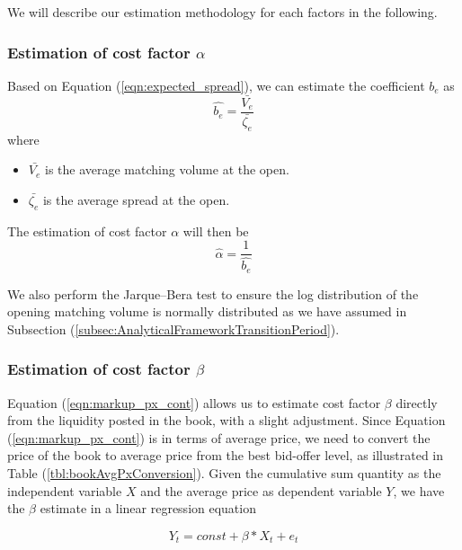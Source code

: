 \documentclass{article}
\begin{document}
We will describe our estimation methodology for each factors in the following.

\subsubsection{Estimation of cost factor $\alpha$}

Based on Equation (\ref{eqn:expected_spread}), we can estimate the coefficient $b_e$ as
\[
  \hat{b_e} = \frac{\bar{V_e}}{\bar{\zeta_e}}
\]
where
\begin{itemize}
  \item $\bar{V_e}$ is the average matching volume at the open.
  \item $\bar{\zeta_e}$ is the average spread at the open.
\end{itemize}

The estimation of cost factor $\alpha$ will then be
\[
  \hat{\alpha} = \frac{1}{\hat{b_e}}
\]

We also perform the Jarque–Bera test to ensure the log distribution of the opening matching volume is normally distributed as we have assumed in Subsection (\ref{subsec:AnalyticalFrameworkTransitionPeriod}).

\subsubsection{Estimation of cost factor $\beta$}

Equation (\ref{eqn:markup_px_cont}) allows us to estimate cost factor $\beta$ directly from the liquidity posted in the book, with a slight adjustment. Since Equation (\ref{eqn:markup_px_cont}) is in terms of average price, we need to convert the price of the book to average price from the best bid-offer level, as illustrated in Table (\ref{tbl:bookAvgPxConversion}). Given the cumulative sum quantity as the independent variable $X$ and the average price as dependent variable $Y$, we have the $\beta$ estimate in a linear regression equation

\[
  Y_t = const + \beta * X_t + e_t
\]
\end{document}
